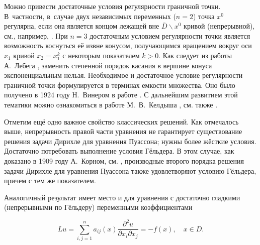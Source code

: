 Можно привести достаточные условия регулярности граничной точки. В~частности, в~случае двух независимых переменных ($n = 2$) точка $x^0$ регулярна, если она является концом лежащей вне ${\bar{D}} \backslash x^0$ кривой (непрерывной), см., например, \cite{gushin:Petr}. При $n = 3$ достаточным условием регулярности точки является возможность коснуться её извне конусом, получающимся вращением вокруг оси $x_1$ кривой $x_2 = x_1^k$ с некоторым показателем $k > 0$. Как следует из работы А.~Лебега \cite{gushin:Leb}, заменить степенной порядок касания в вершине конуса экспоненциальным нельзя. Необходимое и достаточное условие регулярности граничной точки формулируется в терминах емкости множества. Оно было получено в 1924 году Н.~Винером в работе \cite{gushin:Wien}. С дальнейшим развитием этой тематики можно ознакомиться в работе М.~В.~Келдыша \cite{gushin:Keld}, см. также \cite{gushin:GTr}.



Отметим ещё одно важное свойство классических решений. Как отмечалось выше, непрерывность правой части уравнения не гарантирует существование решения задачи Дирихле для уравнения Пуассона; нужны более жёсткие условия. Достаточно потребовать выполнение условия Гёльдера. В этом случае, как доказано в 1909 году А.~Корном, см. \cite{gushin:Korn1}, производные второго порядка решения задачи Дирихле для уравнения Пуассона также удовлетворяют условию Гёльдера, причем с тем же показателем. 


%




Аналогичный результат имеет место и для уравнения с достаточно гладкими (непрерывными по Гёльдеру) переменными коэффициентами

\begin{equation}

\label{gushin:eq3}

L u = \sum\limits_{i,j=1}^n a_{ij}(x) \frac{\partial^2 u}{\partial x_i \partial x_j} = - f(x), \quad x \in D.

\end{equation}

